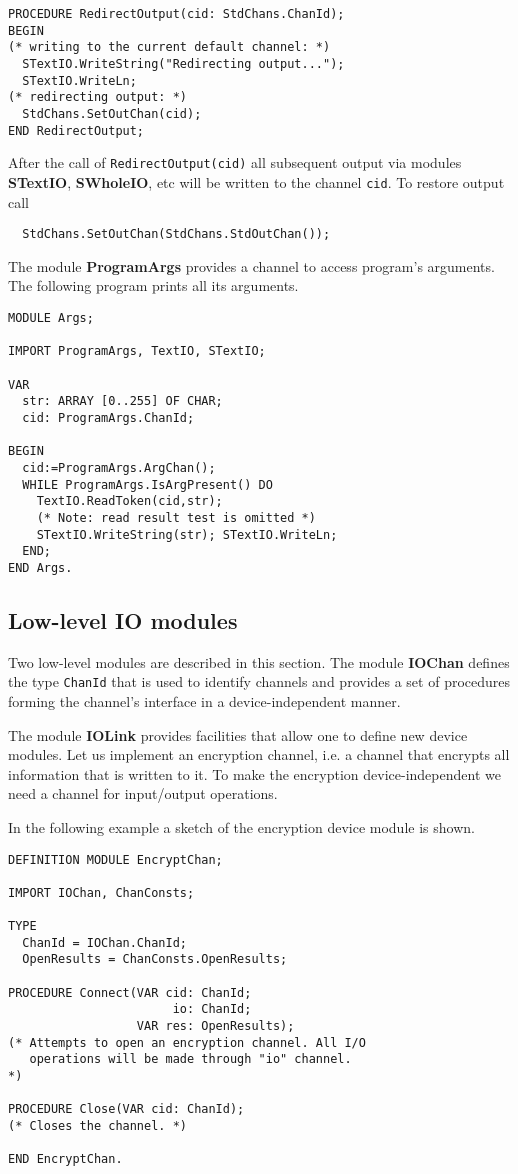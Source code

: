 \begin{verbatim}
PROCEDURE RedirectOutput(cid: StdChans.ChanId);
BEGIN
(* writing to the current default channel: *)
  STextIO.WriteString("Redirecting output...");
  STextIO.WriteLn;
(* redirecting output: *)
  StdChans.SetOutChan(cid);
END RedirectOutput;
\end{verbatim}

After the call of {\tt RedirectOutput(cid)} all subsequent output
via modules {\bf STextIO}, {\bf SWholeIO}, etc will be written to
the channel {\tt cid}. To restore output call
\begin{verbatim}
  StdChans.SetOutChan(StdChans.StdOutChan());
\end{verbatim}

The module {\bf ProgramArgs} provides a channel to access
program's arguments. The following program prints all its arguments.
\begin{verbatim}
MODULE Args;

IMPORT ProgramArgs, TextIO, STextIO;

VAR
  str: ARRAY [0..255] OF CHAR;
  cid: ProgramArgs.ChanId;

BEGIN
  cid:=ProgramArgs.ArgChan();
  WHILE ProgramArgs.IsArgPresent() DO
    TextIO.ReadToken(cid,str);
    (* Note: read result test is omitted *)
    STextIO.WriteString(str); STextIO.WriteLn;
  END;
END Args.
\end{verbatim}

\subsection{Low-level IO modules}\label{lib:ISO:lowio}

Two low-level modules are described in this section. The module
{\bf IOChan} defines the type {\tt ChanId} that is used to
identify channels and provides a set of procedures forming the
channel's interface in a device-independent manner.

The module {\bf IOLink} provides facilities that allow one to define
new device modules. Let us implement an encryption channel, i.e.
a channel that encrypts all information that is written to it. To
make the encryption device-independent we need a channel for input/output
operations.

In the following example a sketch of the encryption device module
is shown.
\begin{verbatim}
DEFINITION MODULE EncryptChan;

IMPORT IOChan, ChanConsts;

TYPE
  ChanId = IOChan.ChanId;
  OpenResults = ChanConsts.OpenResults;

PROCEDURE Connect(VAR cid: ChanId;
                       io: ChanId;
                  VAR res: OpenResults);
(* Attempts to open an encryption channel. All I/O
   operations will be made through "io" channel.
*)

PROCEDURE Close(VAR cid: ChanId);
(* Closes the channel. *)

END EncryptChan.
\end{verbatim}

